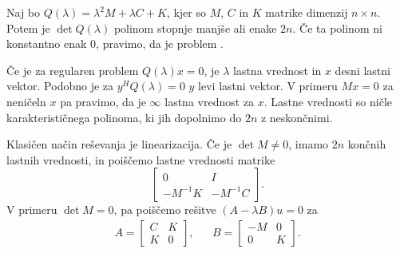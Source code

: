 

Naj bo $Q(\lambda) = \lambda^2 M + \lambda C + K$, kjer so $M$, $C$ in $K$
matrike dimenzij $n \times n$.
Potem je $\det Q(\lambda)$ polinom stopnje manjše ali enake $2n$.
Če ta polinom ni konstantno enak $0$, pravimo, da je problem .

Če je za regularen problem $Q(\lambda) x = 0$, je $\lambda$ lastna vrednost in
$x$ desni lastni vektor.
Podobno je za $y^H Q(\lambda) = 0$ $y$ levi lastni vektor.
V primeru $Mx = 0$ za neničeln $x$ pa pravimo, da je $\infty$ lastna vrednost za
$x$.
Lastne vrednosti so ničle karakterističnega polinoma, ki jih dopolnimo do $2n$ z
neskončnimi.

Klasičen način reševanja je linearizacija.
Če je $\det M \ne 0$, imamo $2n$ končnih lastnih vrednosti, in poiščemo lastne
vrednosti matrike
\[
  \begin{bmatrix}
	0 & I \\
	-M^{-1} K & -M^{-1} C
  \end{bmatrix}.
\]
V primeru $\det M = 0$, pa poiščemo rešitve $(A-\lambda B) u = 0$ za
\begin{align*}
  A =
  \begin{bmatrix}
	C & K \\ K & 0
  \end{bmatrix},
  && B =
	 \begin{bmatrix}
	   -M & 0 \\ 0 & K
	 \end{bmatrix}.
\end{align*}


